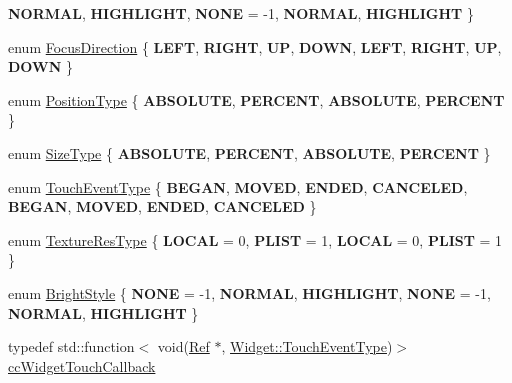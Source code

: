 \begin{DoxyCompactItemize}
{\bfseries N\+O\+R\+M\+AL}, 
{\bfseries H\+I\+G\+H\+L\+I\+G\+HT}, 
{\bfseries N\+O\+NE} = -\/1, 
\newline
{\bfseries N\+O\+R\+M\+AL}, 
{\bfseries H\+I\+G\+H\+L\+I\+G\+HT}
 \}
\item 
enum \hyperlink{classui_1_1Widget_a8ae8e8fc793a04a87584205cd1e8a8a5}{Focus\+Direction} \{ \newline
{\bfseries L\+E\+FT}, 
{\bfseries R\+I\+G\+HT}, 
{\bfseries UP}, 
{\bfseries D\+O\+WN}, 
\newline
{\bfseries L\+E\+FT}, 
{\bfseries R\+I\+G\+HT}, 
{\bfseries UP}, 
{\bfseries D\+O\+WN}
 \}
\item 
enum \hyperlink{classui_1_1Widget_acfb8004ec169575dab6d3e8eb3e92b90}{Position\+Type} \{ {\bfseries A\+B\+S\+O\+L\+U\+TE}, 
{\bfseries P\+E\+R\+C\+E\+NT}, 
{\bfseries A\+B\+S\+O\+L\+U\+TE}, 
{\bfseries P\+E\+R\+C\+E\+NT}
 \}
\item 
enum \hyperlink{classui_1_1Widget_ab7035fc10a00c756523be6bc57cf801c}{Size\+Type} \{ {\bfseries A\+B\+S\+O\+L\+U\+TE}, 
{\bfseries P\+E\+R\+C\+E\+NT}, 
{\bfseries A\+B\+S\+O\+L\+U\+TE}, 
{\bfseries P\+E\+R\+C\+E\+NT}
 \}
\item 
enum \hyperlink{classui_1_1Widget_a4829c0f1cbaf1fd820a9b2ccf0c58c73}{Touch\+Event\+Type} \{ \newline
{\bfseries B\+E\+G\+AN}, 
{\bfseries M\+O\+V\+ED}, 
{\bfseries E\+N\+D\+ED}, 
{\bfseries C\+A\+N\+C\+E\+L\+ED}, 
\newline
{\bfseries B\+E\+G\+AN}, 
{\bfseries M\+O\+V\+ED}, 
{\bfseries E\+N\+D\+ED}, 
{\bfseries C\+A\+N\+C\+E\+L\+ED}
 \}
\item 
enum \hyperlink{classui_1_1Widget_a040a65ec5ad3b11119b7e16b98bd9af0}{Texture\+Res\+Type} \{ {\bfseries L\+O\+C\+AL} = 0, 
{\bfseries P\+L\+I\+ST} = 1, 
{\bfseries L\+O\+C\+AL} = 0, 
{\bfseries P\+L\+I\+ST} = 1
 \}
\item 
enum \hyperlink{classui_1_1Widget_a4040e89d49e005b771ac8a80a13206fc}{Bright\+Style} \{ \newline
{\bfseries N\+O\+NE} = -\/1, 
{\bfseries N\+O\+R\+M\+AL}, 
{\bfseries H\+I\+G\+H\+L\+I\+G\+HT}, 
{\bfseries N\+O\+NE} = -\/1, 
\newline
{\bfseries N\+O\+R\+M\+AL}, 
{\bfseries H\+I\+G\+H\+L\+I\+G\+HT}
 \}
\item 
typedef std\+::function$<$ void(\hyperlink{classRef}{Ref} $\ast$, \hyperlink{classui_1_1Widget_a4829c0f1cbaf1fd820a9b2ccf0c58c73}{Widget\+::\+Touch\+Event\+Type})$>$ \hyperlink{classui_1_1Widget_a4f2987649ba5a33d1edb8b13279b03c9}{cc\+Widget\+Touch\+Callback}

\end{DoxyCompactItemize}
